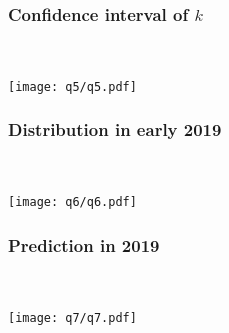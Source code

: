 \documentclass[conf]{new-aiaa}
\begin{document}
\newpage

\subsubsection{Confidence interval of $k$}~

\texttt{[image: q5/q5.pdf]}

\newpage

\subsubsection{Distribution in early 2019}~

\texttt{[image: q6/q6.pdf]}

\newpage

\subsubsection{Prediction in 2019}~

\texttt{[image: q7/q7.pdf]}

\newpage

 
\end{document}
